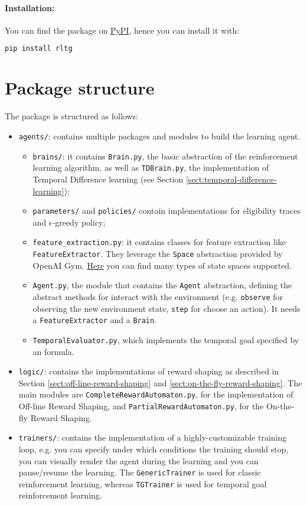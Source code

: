 \paragraph{Installation:} You can find the package on \href{https://pypi.org/project/rltg/}{PyPI}, hence you can install it with:
\begin{lstlisting}[language=bash]
pip install rltg
\end{lstlisting}

\section{Package structure}
The package is structured as follows:
\begin{itemize}
	\item \texttt{agents/}: contains multiple packages and modules to build the learning agent.
	\begin{itemize}
		\item \texttt{brains/}: it contains \texttt{Brain.py}, the basic abstraction of the reinforcement learning algorithm, as well as \texttt{TDBrain.py}, the implementation of Temporal Difference learning (see Section \ref{sect:temporal-difference-learning});
		\item \texttt{parameters/} and \texttt{policies/} contain implementations for eligibility traces and $\epsilon$-greedy policy;
		\item \texttt{feature\_extraction.py}: it contains classes for feature extraction like \texttt{FeatureExtractor}. They leverage the \texttt{Space} abstraction provided by OpenAI Gym. \href{https://github.com/openai/gym/tree/master/gym/spaces}{Here} you can find many types of state spaces supported.
		\item \texttt{Agent.py}, the module that contains the \texttt{Agent} abstraction, defining the abstract methods for interact with the environment (e.g. \texttt{observe} for observing the new environment state, \texttt{step} for choose an action). It needs a \texttt{FeatureExtractor} and a \texttt{Brain}. 
		\item \texttt{TemporalEvaluator.py}, which implements the temporal goal specified by an \LLf formula.
	\end{itemize}
	\item \texttt{logic/}: contains the implementations of reward shaping as described in Section \ref{sect:off-line-reward-shaping} and \ref{sect:on-the-fly-reward-shaping}. The main modules are \texttt{CompleteRewardAutomaton.py}, for the implementation of Off-line Reward Shaping, and \texttt{PartialRewardAutomaton.py}, for the On-the-fly Reward Shaping.
	\item \texttt{trainers/}: contains the implementation of a highly-customizable training loop, e.g. you can specify under which conditions the training should stop, you can visually render the agent during the learning and you can pause/resume the learning. The \texttt{GenericTrainer} is used for classic reinforcement learning, whereas \texttt{TGTrainer} is used for temporal goal reinforcement learning.
\end{itemize}

